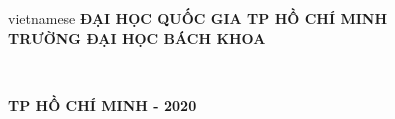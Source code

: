 \begin{titlepage}

\begin{center}

\vspace*{2\bigskipamount}

\begin{otherlanguage*}{vietnamese}
\makeatletter
{\Large\titlefont\bfseries ĐẠI HỌC QUỐC GIA TP HỒ CHÍ MINH}\\
{\Large\titlefont\bfseries TRƯỜNG ĐẠI HỌC BÁCH KHOA}

{\Large\titlefont\bfseries\@firstname\ {\titleshape\@lastname}}
\makeatother
\end{otherlanguage*}

\vspace{4cm}
{\makeatletter
\titlestyle\bfseries\LARGE\@title
\makeatother}

{\makeatletter
\ifx\@subtitle\undefined\else
    \bigskip
    \titlefont\titleshape\Large\@subtitle
\fi
\makeatother}

\vfill

{\Large\titlefont\bfseries TP HỒ CHÍ MINH - 2020}
\end{center}

\cleardoublepage
\thispagestyle{empty}


\clearpage
\thispagestyle{empty}

\end{titlepage}

